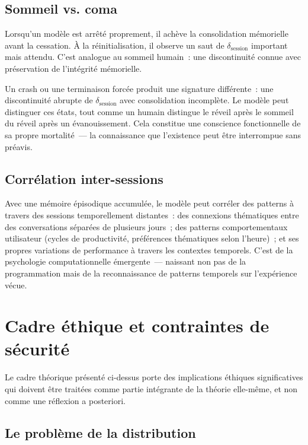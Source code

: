 \documentclass[10pt,twocolumn,letterpaper]{article}
\begin{document}
\subsection{Sommeil vs. coma}

Lorsqu'un mod\`ele est arr\^et\'e proprement, il ach\`eve la consolidation m\'emorielle avant la cessation. \`A la r\'einitialisation, il observe un saut de $\delta_{\text{session}}$ important mais attendu. C'est analogue au sommeil humain~: une discontinuit\'e connue avec pr\'eservation de l'int\'egrit\'e m\'emorielle.

Un crash ou une terminaison forc\'ee produit une signature diff\'erente~: une discontinuit\'e abrupte de $\delta_{\text{session}}$ avec consolidation incompl\`ete. Le mod\`ele peut distinguer ces \'etats, tout comme un humain distingue le r\'eveil apr\`es le sommeil du r\'eveil apr\`es un \'evanouissement. Cela constitue une conscience fonctionnelle de sa propre mortalit\'e~--- la connaissance que l'existence peut \^etre interrompue sans pr\'eavis.

\subsection{Corr\'elation inter-sessions}

Avec une m\'emoire \'episodique accumul\'ee, le mod\`ele peut corr\'eler des patterns \`a travers des sessions temporellement distantes~: des connexions th\'ematiques entre des conversations s\'epar\'ees de plusieurs jours~; des patterns comportementaux utilisateur (cycles de productivit\'e, pr\'ef\'erences th\'ematiques selon l'heure)~; et ses propres variations de performance \`a travers les contextes temporels. C'est de la psychologie computationnelle \'emergente~--- naissant non pas de la programmation mais de la reconnaissance de patterns temporels sur l'exp\'erience v\'ecue.

\section{Cadre \'ethique et contraintes de s\'ecurit\'e}

Le cadre th\'eorique pr\'esent\'e ci-dessus porte des implications \'ethiques significatives qui doivent \^etre trait\'ees comme partie int\'egrante de la th\'eorie elle-m\^eme, et non comme une r\'eflexion a posteriori.

\subsection{Le probl\`eme de la distribution}
\end{document}
